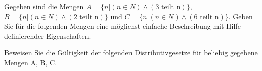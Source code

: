 \documentclass[10pt, a4paper]{exam}
\begin{document}
\begin{questions}

    \question Gegeben sind die Mengen $A=\{n | (n \in  N) \wedge  (\text{3 teilt n})\}$, $B=\{n|(n \in  N) \wedge (\text{2 teilt n})\}$ und $C=\{n | (n \in  N) \wedge (\text{6 teilt n})\}$. Geben Sie für die folgenden Mengen eine möglichst einfache Beschreibung mit Hilfe definierender Eigenschaften.

    \question Beweisen Sie die Gültigkeit der folgenden Distributivgesetze für beliebig gegebene Mengen A, B, C.
\end{questions}
\end{document}
